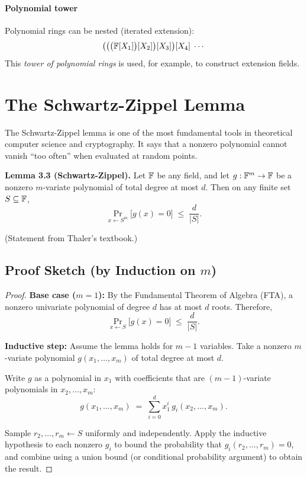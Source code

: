 \documentclass[11pt]{article}
\begin{document}
\paragraph{Polynomial tower}
Polynomial rings can be nested (iterated extension):
\[
  \bigl(\bigl(\bigl(\mathbb{F}[X_1]\bigr)[X_2]\bigr)[X_3]\bigr)[X_4] \;\cdots
\]
This \emph{tower of polynomial rings} is used, for example, to construct
extension fields.

\section{The Schwartz-Zippel Lemma}
\label{sec:schwartz-zippel}

The Schwartz-Zippel lemma is one of the most fundamental tools in
theoretical computer science and cryptography. It says that a nonzero
polynomial cannot vanish ``too often'' when evaluated at random points.

\begin{tcolorbox}[colback=yellow!10!white, colframe=orange!70!black,
                  title=Lemma (Schwartz-Zippel), label=lem:sz]
\textbf{Lemma 3.3 (Schwartz-Zippel).}
Let $\mathbb{F}$ be any field, and let $g : \mathbb{F}^m \to \mathbb{F}$ be a nonzero $m$-variate
polynomial of total degree at most $d$. Then on any finite set
$S \subseteq \mathbb{F}$,
\[
  \Pr_{x \leftarrow S^m}\!\bigl[g(x) = 0\bigr] \;\leq\; \frac{d}{|S|}.
\]
\end{tcolorbox}

\noindent
(Statement from Thaler's textbook.)

\subsection{Proof Sketch (by Induction on $m$)}

\begin{proof}
\textbf{Base case ($m = 1$):}
By the Fundamental Theorem of Algebra (FTA), a nonzero univariate polynomial
of degree $d$ has at most $d$ roots. Therefore,
\[
  \Pr_{x \leftarrow S}\!\bigl[g(x) = 0\bigr] \;\leq\; \frac{d}{|S|}.
\]

\textbf{Inductive step:}
Assume the lemma holds for $m - 1$ variables. Take a nonzero $m$-variate
polynomial $g(x_1, \ldots, x_m)$ of total degree at most $d$.

Write $g$ as a polynomial in $x_1$ with coefficients that are
$(m-1)$-variate polynomials in $x_2, \ldots, x_m$:
\[
  g(x_1, \ldots, x_m) \;=\; \sum_{i=0}^{d} x_1^i \,g_i(x_2, \ldots, x_m).
\]

Sample $r_2, \ldots, r_m \leftarrow S$ uniformly and independently.
Apply the inductive hypothesis to each nonzero $g_i$ to bound the
probability that $g_i(r_2, \ldots, r_m) = 0$, and combine using a
union bound (or conditional probability argument) to obtain the result.
\end{proof}
\end{document}
